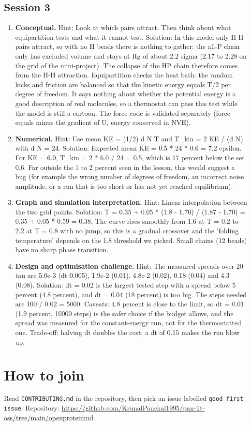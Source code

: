 \documentclass[11pt,a4paper]{article}
\begin{document}
\subsection*{Session 3}
\begin{enumerate}[nosep]
\item \textbf{Conceptual.} Hint: Look at which pairs attract. Then think about what equipartition tests and what it cannot test. Solution: In this model only H-H pairs attract, so with no H beads there is nothing to gather: the all-P chain only has excluded volume and stays at Rg of about 2.2 sigma (2.17 to 2.28 on the grid of the mini-project). The collapse of the HP chain therefore comes from the H-H attraction. Equipartition checks the heat bath: the random kicks and friction are balanced so that the kinetic energy equals T/2 per degree of freedom. It says nothing about whether the potential energy is a good description of real molecules, so a thermostat can pass this test while the model is still a cartoon. The force code is validated separately (force equals minus the gradient of U, energy conserved in NVE).
\item \textbf{Numerical.} Hint: Use mean KE = (1/2) d N T and T\_kin = 2 KE / (d N) with d N = 24. Solution: Expected mean KE = 0.5 * 24 * 0.6 = 7.2 epsilon. For KE = 6.0, T\_kin = 2 * 6.0 / 24 = 0.5, which is 17 percent below the set 0.6. Far outside the 1 to 2 percent seen in the lesson, this would suggest a bug (for example the wrong number of degrees of freedom, an incorrect noise amplitude, or a run that is too short or has not yet reached equilibrium).
\item \textbf{Graph and simulation interpretation.} Hint: Linear interpolation between the two grid points. Solution: T = 0.35 + 0.05 * (1.8 - 1.70) / (1.87 - 1.70) = 0.35 + 0.05 * 0.59 = 0.38. The curve rises smoothly from 1.6 at T = 0.2 to 2.2 at T = 0.8 with no jump, so this is a gradual crossover and the 'folding temperature' depends on the 1.8 threshold we picked. Small chains (12 beads) have no sharp phase transition.
\item \textbf{Design and optimisation challenge.} Hint: The measured spreads over 20 tau are 5.0e-3 (dt 0.005), 1.9e-2 (0.01), 4.8e-2 (0.02), 0.18 (0.04) and 4.3 (0.08). Solution: dt = 0.02 is the largest tested step with a spread below 5 percent (4.8 percent), and dt = 0.04 (18 percent) is too big. The steps needed are 100 / 0.02 = 5000. Caveats: 4.8 percent is close to the limit, so dt = 0.01 (1.9 percent, 10000 steps) is the safer choice if the budget allows, and the spread was measured for the constant-energy run, not for the thermostatted one. Trade-off: halving dt doubles the cost; a dt of 0.15 makes the run blow up.
\end{enumerate}

\section{How to join}
Read \texttt{CONTRIBUTING.md} in the repository, then pick an issue labelled \texttt{good first issue}. Repository: \url{https://github.com/KrunalPanchal1995/pan-iit-oss/tree/main/openproteinmd}
\end{document}
